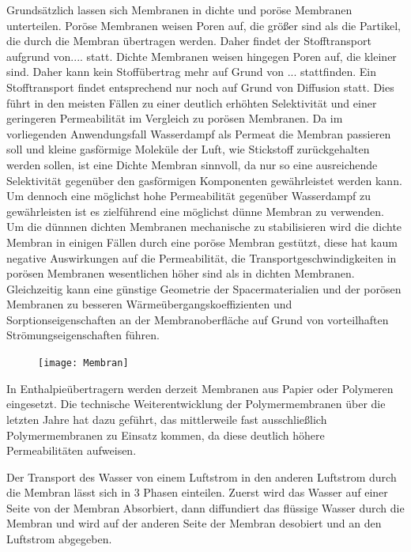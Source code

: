 \documentclass[ 11pt
				,ngerman
				,headsepline
				,headings=small
				,numbers=noenddot %
				,draft=false
				,BCOR=0mm %
				,DIV=12
				,captions=tableheading
				,paper=a4
				,abstracton
                ]{scrreprt}
\begin{document}
\begin{normalsize}
\begin{LARGE}
Grundsätzlich lassen sich Membranen in dichte und poröse Membranen unterteilen. Poröse Membranen weisen Poren auf, die größer sind als die Partikel, die durch die Membran übertragen werden. Daher findet der Stofftransport aufgrund von.... statt. Dichte Membranen weisen hingegen Poren auf, die kleiner sind. Daher kann kein Stoffübertrag mehr auf Grund von ... stattfinden. Ein Stofftransport findet entsprechend nur noch auf Grund von Diffusion statt. Dies führt in den meisten Fällen zu einer deutlich erhöhten Selektivität und einer geringeren Permeabilität im Vergleich zu porösen Membranen. Da im vorliegenden Anwendungsfall Wasserdampf als Permeat die Membran passieren soll und kleine gasförmige Moleküle der Luft, wie Stickstoff zurückgehalten werden sollen, ist eine Dichte Membran sinnvoll, da nur so eine ausreichende Selektivität gegenüber den gasförmigen Komponenten gewährleistet werden kann. Um dennoch eine möglichst hohe Permeabilität gegenüber Wasserdampf zu gewährleisten ist es zielführend eine möglichst dünne Membran zu verwenden. Um die dünnnen dichten Membranen mechanische zu stabilisieren wird die dichte Membran in einigen Fällen durch eine poröse Membran gestützt, diese hat kaum negative Auswirkungen auf die Permeabilität, die Transportgeschwindigkeiten in porösen Membranen wesentlichen höher sind als in dichten Membranen. Gleichzeitig kann eine günstige Geometrie der Spacermaterialien und der porösen Membranen zu besseren Wärmeübergangskoeffizienten und Sorptionseigenschaften an der Membranoberfläche auf Grund von vorteilhaften Strömungseigenschaften führen. %
\begin{figure}
	\texttt{[image: Membran]}
\end{figure}

In Enthalpieübertragern werden derzeit Membranen aus Papier oder Polymeren eingesetzt. Die technische Weiterentwicklung der Polymermembranen über die letzten Jahre hat dazu geführt, das mittlerweile fast ausschließlich Polymermembranen zu Einsatz kommen, da diese deutlich höhere Permeabilitäten aufweisen. 

Der Transport des Wasser von einem Luftstrom in den anderen Luftstrom durch die Membran lässt sich in 3 Phasen einteilen. Zuerst wird das Wasser auf einer Seite von der Membran Absorbiert, dann diffundiert das flüssige Wasser durch die Membran und wird auf der anderen Seite der Membran desobiert und an den Luftstrom abgegeben. 





\end{LARGE}
\end{normalsize}
\end{document}
